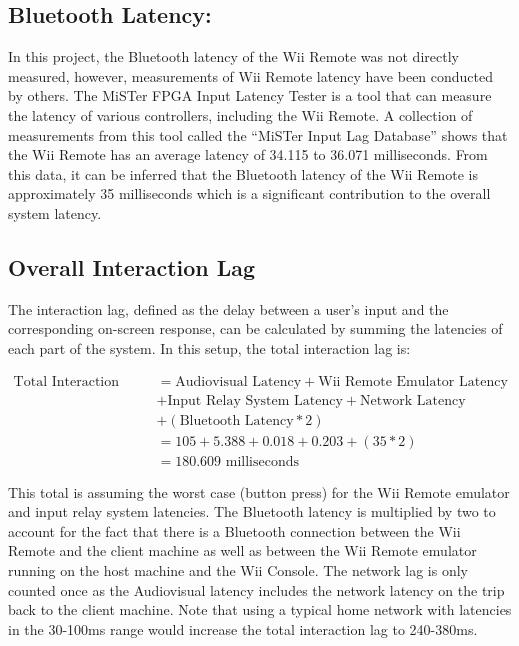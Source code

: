 \subsection{Bluetooth Latency:}

In this project, the Bluetooth latency of the Wii Remote was not directly
measured, however, measurements of Wii Remote latency have
been conducted by others. The MiSTer FPGA Input Latency
Tester\cite{cathoderayblogTestYour} is a tool that can measure the latency of
various controllers, including the Wii Remote. A collection of measurements from
this tool called the ``MiSTer Input Lag Database''\cite{misterInputLagDatabase}
shows that the Wii Remote has an average latency of 34.115 to 36.071
milliseconds. From this data, it can be inferred that the Bluetooth latency of
the Wii Remote is approximately 35 milliseconds which is a significant
contribution to the overall system latency.

\subsection{Overall Interaction Lag}

The interaction lag, defined as the delay between a user’s input and the
corresponding on-screen response\cite{volkerseekerBestPaper}, can be calculated by
summing the latencies of each part of the system. In this setup, the total interaction lag is:

\begin{align*}
  \text{Total Interaction Lag} &= \text{Audiovisual Latency} + \text{Wii Remote Emulator Latency} \\
  &+ \text{Input Relay System Latency} + \text{Network Latency} \\
  &+ (\text{Bluetooth Latency} * 2) \\
  &= 105 + 5.388 + 0.018 + 0.203 + (35 * 2) \\
  &= 180.609 \text{ milliseconds}
\end{align*}

This total is assuming the worst case (button press) for the Wii Remote emulator
and input relay system latencies. The Bluetooth latency is multiplied by two to
account for the fact that there is a Bluetooth connection between the Wii Remote
and the client machine as well as between the Wii Remote emulator running on the
host machine and the Wii Console. The network lag is only counted once as the
Audiovisual latency includes the network latency on the trip back to the client
machine. Note that using a typical home network with latencies in the 30-100ms
range would increase the total interaction lag to 240-380ms.

